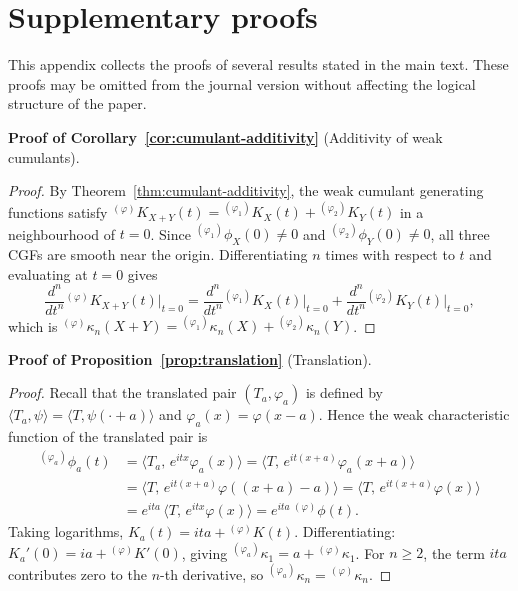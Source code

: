 \documentclass[12pt]{article}
\theoremstyle{definition}
\begin{document}
\section{Supplementary proofs}
\label{app:proofs}

This appendix collects the proofs of several results stated in the main text.  These proofs may be omitted from the journal version without affecting the logical structure of the paper.

\medskip
\noindent\textbf{Proof of Corollary~\ref{cor:cumulant-additivity}}
(Additivity of weak cumulants).

\begin{proof}
By Theorem~\ref{thm:cumulant-additivity}, the weak cumulant generating
functions satisfy
${}^{(\varphi)}K_{X+Y}(t) = {}^{(\varphi_1)}K_X(t) + {}^{(\varphi_2)}K_Y(t)$
in a neighbourhood of $t=0$.  Since ${}^{(\varphi_1)}\phi_X(0)\neq 0$ and
${}^{(\varphi_2)}\phi_Y(0)\neq 0$, all three CGFs are smooth near the
origin.  Differentiating $n$ times with respect to $t$ and evaluating
at $t=0$ gives
\[
\frac{d^n}{dt^n}{}^{(\varphi)}K_{X+Y}(t)\Big|_{t=0}
=
\frac{d^n}{dt^n}{}^{(\varphi_1)}K_X(t)\Big|_{t=0}
+
\frac{d^n}{dt^n}{}^{(\varphi_2)}K_Y(t)\Big|_{t=0},
\]
which is ${}^{(\varphi)}\kappa_n(X+Y) = {}^{(\varphi_1)}\kappa_n(X)
+ {}^{(\varphi_2)}\kappa_n(Y)$.
\end{proof}

\medskip
\noindent\textbf{Proof of Proposition~\ref{prop:translation}}
(Translation).

\begin{proof}
Recall that the translated pair $(T_a,\varphi_a)$ is defined by
$\langle T_a,\psi\rangle = \langle T,\psi(\cdot+a)\rangle$ and
$\varphi_a(x) = \varphi(x-a)$.  Hence the weak characteristic function
of the translated pair is
\begin{align*}
{}^{(\varphi_a)}\phi_a(t)
&= \langle T_a,\,e^{itx}\varphi_a(x)\rangle
= \langle T,\,e^{it(x+a)}\varphi_a(x+a)\rangle \\
&= \langle T,\,e^{it(x+a)}\varphi((x+a)-a)\rangle
= \langle T,\,e^{it(x+a)}\varphi(x)\rangle \\
&= e^{ita}\,\langle T,\,e^{itx}\varphi(x)\rangle
= e^{ita}\,{}^{(\varphi)}\phi(t).
\end{align*}
Taking logarithms, $K_a(t) = ita + {}^{(\varphi)}K(t)$.  Differentiating:
$K_a'(0) = ia + {}^{(\varphi)}K'(0)$, giving
${}^{(\varphi_a)}\kappa_1 = a + {}^{(\varphi)}\kappa_1$.  For $n\geq 2$,
the term $ita$ contributes zero to the $n$-th derivative, so
${}^{(\varphi_a)}\kappa_n = {}^{(\varphi)}\kappa_n$.
\end{proof}
\end{document}
